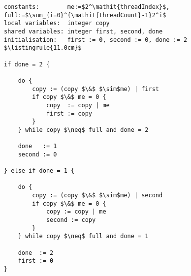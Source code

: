 \begin{center}
\begin{minipage}{\textwidth}
\begin{lstlisting}[mathescape, linewidth=11.0cm]
constants:        me:=$2^\mathit{threadIndex}$, full:=$\sum_{i=0}^{\mathit{threadCount}-1}2^i$
local variables:  integer copy
shared variables: integer first, second, done
initialisation:   first := 0, second := 0, done := 2
$\listingrule{11.0cm}$

if done = 2 {

	do {
		copy := (copy $\&$ $\sim$me) | first
		if copy $\&$ me = 0 {
			copy  := copy | me
			first := copy
		}
	} while copy $\neq$ full and done = 2

	done   := 1
	second := 0

} else if done = 1 {

	do {
		copy := (copy $\&$ $\sim$me) | second
		if copy $\&$ me = 0 {
			copy := copy | me
			second := copy
		}
	} while copy $\neq$ full and done = 1

	done  := 2
	first := 0
}
\end{lstlisting}
\end{minipage}
\end{center}
